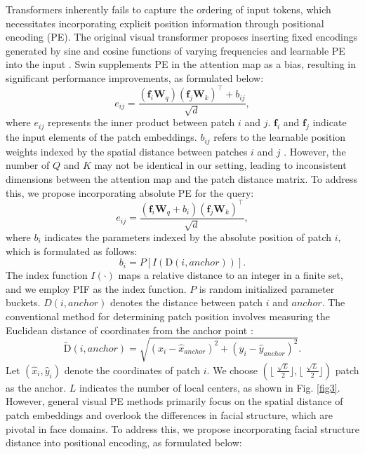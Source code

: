 \documentclass[sigconf]{acmart}
\begin{document}
Transformers inherently fails to capture the ordering of input tokens, which necessitates incorporating explicit position information through positional encoding (PE). The original visual transformer proposes inserting fixed encodings generated by sine and cosine functions of varying frequencies and learnable PE into the input \cite{vit}. Swin \cite{swin} supplements PE in the attention map as a bias, resulting in significant performance improvements, as formulated below:
\begin{equation}
e_{ij} = \frac{(\bm{f}_i\bm{W}_{q})(\bm{f}_j\bm{W}_{k})^\top+b_{ij}}{\sqrt{d}},
\label{eq5}
\end{equation}
where $e_{ij}$ represents the inner product between patch $i$ and $j$. $\bm{f}_i$ and $\bm{f}_j$ indicate the input elements of the patch embeddings. $b_{ij}$ refers to the learnable position weights indexed by the spatial distance between patches $i$ and $j$ \cite{swin}. However, the number of $Q$ and $K$ may not be identical in our setting, leading to inconsistent dimensions between the attention map and the patch distance matrix. To address this, we propose incorporating absolute PE for the query:
\begin{equation}
e_{ij} = \frac{(\bm{f}_i\bm{W}_{q}+b_{i})(\bm{f}_j\bm{W}_{k})^\top}{\sqrt{d}},
\label{eq6}
\end{equation}
where $b_i$ indicates the parameters indexed by the absolute position of patch $i$, which is formulated as follows:
\begin{equation}
b_{i} = P[I(\mbox{D}(i,anchor))].
\label{eq7}
\end{equation}
The index function $I(\cdot)$ maps a relative distance to an integer in a finite set, and we employ PIF \cite{ape} as the index function. $P$ is random initialized parameter buckets. $D(i,anchor)$ denotes the distance between patch $i$ and $anchor$. The conventional method for determining patch position involves measuring the Euclidean distance of coordinates from the anchor point \cite{ape}:
\begin{equation}
\tilde{\mbox{D}}(i,anchor) = \sqrt{(\hat{x}_i-\hat{x}_{anchor})^2+(\hat{y}_i-\hat{y}_{anchor})^2}.
\label{eq8}
\end{equation}
Let $(\hat{x}_i,\hat{y}_i)$ denote the coordinates of patch $i$. We choose $(\lfloor\!\!\!\;\frac{\sqrt{L}}{2}\!\rfloor,\lfloor\!\!\!\;\frac{\sqrt{L}}{2}\!\rfloor)$ patch as the anchor. $L$ indicates the number of local centers, as shown in Fig. \ref{fig3}. However, general visual PE methods primarily focus on the spatial distance of patch embeddings and overlook the differences in facial structure, which are pivotal in face domains. To address this, we propose incorporating facial structure distance into positional encoding, as formulated below:
\end{document}
